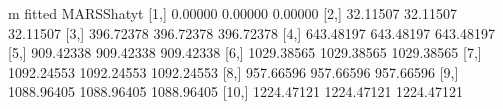 \begin{Schunk}
\begin{Soutput}
               m     fitted MARSShatyt
 [1,]    0.00000    0.00000    0.00000
 [2,]   32.11507   32.11507   32.11507
 [3,]  396.72378  396.72378  396.72378
 [4,]  643.48197  643.48197  643.48197
 [5,]  909.42338  909.42338  909.42338
 [6,] 1029.38565 1029.38565 1029.38565
 [7,] 1092.24553 1092.24553 1092.24553
 [8,]  957.66596  957.66596  957.66596
 [9,] 1088.96405 1088.96405 1088.96405
[10,] 1224.47121 1224.47121 1224.47121
\end{Soutput}
\end{Schunk}
